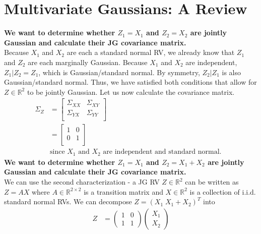 \documentclass[10pt,a4paper]{article}
\begin{document}
\section{Multivariate Gaussians: A Review}
\textbf{We want to determine whether $Z_{1} = X_{1}$ and $Z_{2} = X_{2}$ are jointly Gaussian and calculate their JG covariance matrix.} \\
Because $X_1$ and $X_2$ are each a standard normal RV, we already know that $Z_1$ and $Z_2$ are each marginally Gaussian. Because $X_1$ and $X_2$ are independent, $Z_{1}|Z_{2} = Z_{1}$, which is Gaussian/standard normal. By symmetry, $Z_{2}|Z_{1}$ is also Gaussian/standard normal. Thus, we have satisfied both conditions that allow for $Z \in \mathbb{R}^{2}$ to be jointly Gaussian. Let us now calculate the covariance matrix.
\begin{align*}
  \Sigma_{Z} &= \begin{bmatrix}
                  \Sigma_{XX} & \Sigma_{XY} \\
                  \Sigma_{YX} & \Sigma_{YY} \\
                \end{bmatrix}& \\
             &= \begin{bmatrix}
                  1 & 0 \\
                  0 & 1 \\
                \end{bmatrix}& \\
            &\text{since $X_1$ and $X_2$ are independent and standard normal.}&
\end{align*}
\textbf{We want to determine whether $Z_{1} = X_{1}$ and $Z_{2} = X_{1} + X_{2}$ are jointly Gaussian and calculate their JG covariance matrix.} \\
We can use the second characterization - a JG RV $Z \in \mathbb{R}^{2}$ can be written as $Z = AX$ where $A \in \mathbb{R}^{2 \times 2}$ is a transition matrix and $X \in \mathbb{R}^{2}$ is a collection of i.i.d. standard normal RVs. We can decompose $Z = (X_{1} \; X_1 + X_2)^{T}$ into
\begin{align*}
  Z &= \begin{pmatrix}
          1 & 0 \\
          1 & 1
       \end{pmatrix}
       \begin{pmatrix}
         X_1 \\
         X_2
       \end{pmatrix}
\end{align*}
\end{document}
